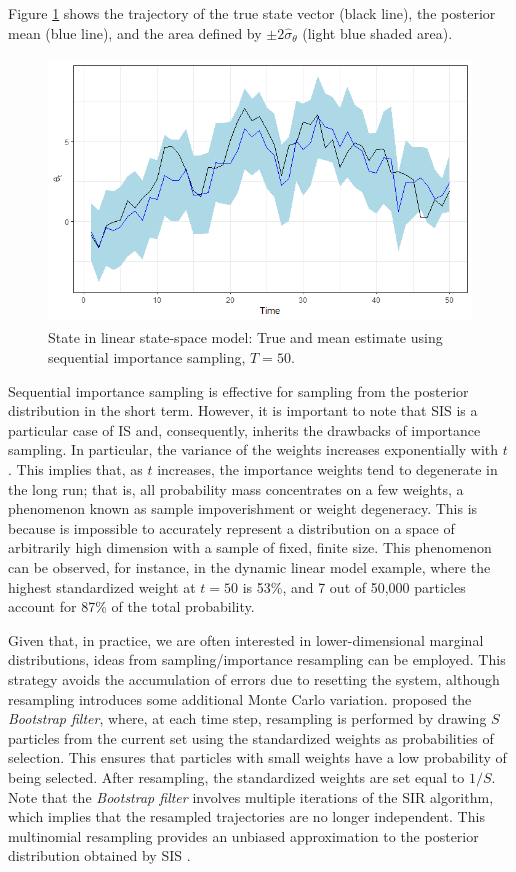 Figure \ref{fig58} shows the trajectory of the true state vector (black line), the posterior mean (blue line), and the area defined by $\pm2\hat{\sigma}_{\theta}$ (light blue shaded area).

\begin{figure}[!h]
	\includegraphics[width=340pt, height=200pt]{Chapters/chapter5/figures/SIS.png}
	\caption[List of figure caption goes here]{State in linear state-space model: True and mean estimate using sequential importance sampling, $T=50$.}\label{fig58}
\end{figure} 

Sequential importance sampling is effective for sampling from the posterior distribution in the short term. However, it is important to note that SIS is a particular case of IS and, consequently, inherits the drawbacks of importance sampling. In particular, the variance of the weights increases exponentially with $t$ \cite{kong1994sequential}. This implies that, as $t$ increases, the importance weights tend to degenerate in the long run; that is, all probability mass concentrates on a few weights, a phenomenon known as sample impoverishment or weight degeneracy. This is because is impossible to accurately
represent a distribution on a space of arbitrarily high dimension with a sample of fixed, finite size. This phenomenon can be observed, for instance, in the dynamic linear model example, where the highest standardized weight at $t=50$ is 53\%, and 7 out of 50,000 particles account for 87\% of the total probability.

Given that, in practice, we are often interested in lower-dimensional marginal distributions, ideas from sampling/importance resampling can be employed. This strategy avoids the accumulation of errors due to resetting the system, although resampling introduces some additional Monte Carlo variation. \cite{Gordon1993} proposed the \textit{Bootstrap filter}, where, at each time step, resampling is performed by drawing $S$ particles from the current set using the standardized weights as probabilities of selection. This ensures that particles with small weights have a low probability of being selected. After resampling, the standardized weights are set equal to $1/S$. Note that the \textit{Bootstrap filter} involves multiple iterations of the SIR algorithm, which implies that the resampled trajectories are no longer independent. This multinomial resampling provides an unbiased approximation to the posterior distribution obtained by SIS \cite{doucet2009tutorial}.  

